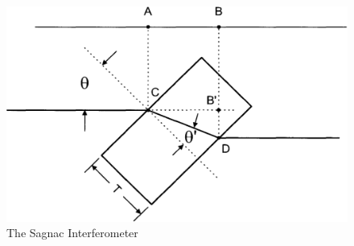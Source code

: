 \begin{figure}
  \includegraphics[width=\linewidth]{./figures/glasplaettchen.pdf}
  \caption{The Sagnac Interferometer}
  \label{fig:glasplaettchen}
\end{figure}












